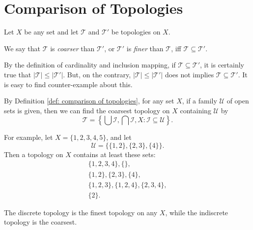 \section{Comparison of Topologies}


\begin{definition}
	\label{def: comparison of topologies}
	Let $X$ be any set and let $\mathcal T$ and $\mathcal T'$ be topologies on $X$.
	
	We say that $\mathcal T$ is \textit{coarser} than $\mathcal T'$, or $\mathcal T'$ is \textit{finer} than $\mathcal T$, iff $\mathcal T \subseteq \mathcal T'$.
\end{definition}


\begin{note}
	By the definition of cardinality and inclusion mapping, if $\mathcal T \subseteq \mathcal T'$, it is certainly true that $| \mathcal T | \le | \mathcal T' |$. But, on the contrary, $| \mathcal T | \le |\mathcal T'|$ does not implies $\mathcal T \subseteq \mathcal T'$. It is easy to find counter-example about this.
\end{note}


\begin{example}
	By Definition \ref{def: comparison of topologies}, for any set $X$, if a family $\mathcal U$ of open sets is given, then we can find the coarsest topology on $X$ containing $\mathcal U$ by
	$$
	\mathcal T = \left\{ \bigcup \mathcal I, \bigcap \mathcal I, X : \mathcal I \subseteq \mathcal U \right\}.
	$$
	
	For example, let $X = \{1,2,3,4,5\}$, and let
	$$
	\mathcal U = \{\{1,2\}, \{2,3\}, \{4\}\}.
	$$
	Then a topology on $X$ contains at least these sets:
	$$
	\begin{matrix}
		\{1,2,3, 4\}, \{\}, \\
		\{1,2\}, \{2,3\}, \{4\}, \\
		\{1,2,3\}, \{1,2,4\}, \{2,3,4\}, \\
		\{2\}.
	\end{matrix}
	$$
\end{example}


\begin{example}
	The discrete topology is the finest topology on any $X$, while the indiscrete topology is the coarsest.
\end{example}


